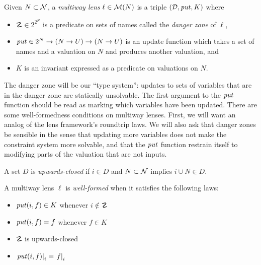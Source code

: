 \begin{definition}
    Given $N\subset\mathcal N$, a \emph{multiway lens} $\ell \in \mathcal M(N)$
    is a triple $(\mathcal D,\mathit{put},K)$ where
    \begin{itemize}
        \item $\danger \in 2^{2^N}$ is a predicate on sets of names called the \emph{danger
            zone} of $\ell$,
        \item $\mathit{put} \in 2^N \to (N \to U) \to (N \to U)$ is an update
            function which takes a set of names and a valuation on $N$ and
            produces another valuation, and
        \item $K$ is an invariant expressed as a predicate on valuations on
            $N$.
    \end{itemize}
\end{definition}

The danger zone will be our ``type system'': updates to sets of variables
that are in the danger zone are statically unsolvable. The first argument to
the $\mathit{put}$ function should be read as marking which variables have been
updated. There are some well-formedness conditions on multiway lenses.
First, we will want an analog of the lens framework's roundtrip laws. We
will also ask that danger zones be sensible in the sense that updating more
variables does not make the constraint system more solvable, and that the
$\mathit{put}$ function restrain itself to modifying parts of the valuation that
are not inputs.

\begin{definition}
    A set $D$ is \emph{upwards-closed} if $i \in D$ and $N \subset \mathcal N$
    implies $i \cup N \in D$.
\end{definition}

\begin{definition}
    A multiway lens $\ell$ is \emph{well-formed} when it satisfies the
    following laws:
    \begin{itemize}
        \item $\mathit{put}(i,f) \in K$ whenever $i \notin \danger$
        \item $\mathit{put}(i,f) = f$ whenever $f \in K$
        \item $\danger$ is upwards-closed
        \item $\left.\mathit{put}(i,f)\right|_i = \left.f\right|_i$
    \end{itemize}
\end{definition}

